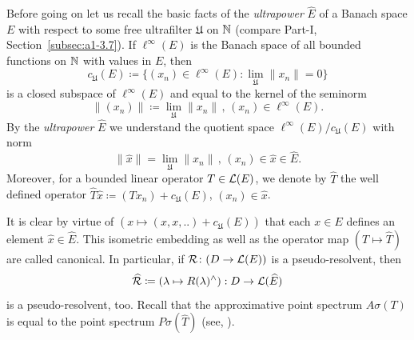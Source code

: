 Before going on let us recall the basic facts of the \emph{ultrapower} $\widehat{E}$ of a Banach space $E$ with respect to some free ultrafilter $\mathfrak{U}$ on $\mathbb{N} $ (compare Part-I, Section~\ref{subsec:a1-3.7}).
If\/ $\ell^{\infty}(E)$ is the Banach space of all bounded functions on $\mathbb{N} $ with values in $E$, then
\[
c_{\mathfrak{U}}(E) \coloneq \{(x_{n}) \in \ell^{\infty}(E) \colon \lim_{\mathfrak{U}}\|x_{n}\| = 0\}
\]
is a closed subspace of\/ $\ell^{\infty}(E)$ and equal to the kernel of the seminorm
\[
\|(x_{n})\| \coloneq \lim_{\mathfrak{U}}\|x_{n}\| \, , \, (x_{n}) \in \ell^{\infty}(E).
\]
By the \emph{ultrapower} $\widehat{E}$ we understand the quotient space $\ell^{\infty}(E)/c_{\mathfrak{U}}(E)$ with norm
\[
\|\hat{x}\| = \lim_{\mathfrak{U}}\|x_{n}\| \, , \, (x_{n}) \in \hat{x} \in \widehat{E}.
\]
Moreover, for a bounded linear operator $T \in \mathcal{L}(E)$, we denote by $\widehat{T}$ the well defined operator $\widehat{T}\hat{x} \coloneq (Tx_{n}) + c_{\mathfrak{U}}(E)$, $(x_{n}) \in \hat{x}$.

It is clear by virtue of\/ $(x \mapsto (x, x, ..) + c_{\mathfrak{U}}(E))$ that each $x \in E$ defines an element $\hat{x} \in \widehat{E}$.
This isometric embedding as well as the operator map $(T \mapsto \widehat{T})$ are called canonical.
In particular, if\/ $\mathcal{R} \colon (D \to \mathcal{L}(E))$ is a pseudo-resolvent, then
\[
\widehat{\mathcal{R}} \coloneq (\lambda \mapsto R(\lambda)^{\wedge}): D \to \mathcal{L}(\widehat{E})
\]
is a pseudo-resolvent, too.
Recall that the approximative point spectrum $A{\sigma}(T)$ is equal to the point spectrum $P{\sigma}(\widehat{T})$ (see, \eg \textcite[Chapter V, §1]{schaefer:1974}).

